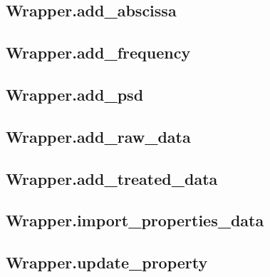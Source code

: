 \subsection{Wrapper.add\_abscissa}\label{subsec:wrapper.add_abscissa}


\subsection{Wrapper.add\_frequency}\label{subsec:wrapper.add_frequency}


\subsection{Wrapper.add\_psd}\label{subsec:wrapper.add_psd}


\subsection{Wrapper.add\_raw\_data}\label{subsec:wrapper.add_raw_data}


\subsection{Wrapper.add\_treated\_data}\label{subsec:wrapper.add_treated_data}


\subsection{Wrapper.import\_properties\_data}\label{subsec:wrapper.import_properties_data}


\subsection{Wrapper.update\_property}\label{subsec:wrapper.update_property}
